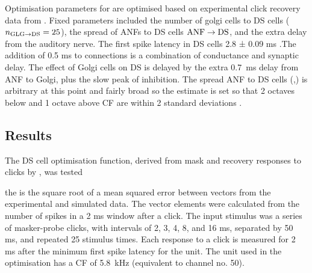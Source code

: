 % 

Optimisation parameters for \GLGDS are optimised based on experimental click
recovery data from \citep{BackoffPalombiEtAl:1997}.  Fixed parameters included
the number of golgi cells to DS cells ($\protect n_{\protect\textrm{{GLG}}\to\textrm{{DS}}} = 25$), the spread of ANFs to DS
cells $\protect\textrm{{ANF}}\to\textrm{{DS}}$, and the extra delay from the auditory nerve.  The first spike
latency in DS cells 2.8 ± 0.09 ms \citep{RhodeSmith:1986}.The addition of 0.5 ms
to \ANFDS connections is a combination of conductance and synaptic delay. The
effect of Golgi cells on DS is delayed by the extra 0.7~ms delay from ANF to
Golgi, plus the slow peak of \GABAa inhibition.  The spread ANF to DS cells
(\sANFDSh,\sANFDSl) is arbitrary at this point and fairly broad so the estimate
is set so that 2 octaves below and 1 octave above CF are within 2 standard
deviations \citep{PaoliniClark:1999}.






\subsection{Results}

The DS cell optimisation function, derived from mask and recovery responses to clicks by \citet{BackoffPalombiEtAl:1997}, was tested 


the is the square root of a mean squared error between vectors from the
experimental and simulated data. The vector elements were calculated from the
number of spikes in a 2 ms window after a click.  The input stimulus was a
series of masker-probe clicks, with intervals of 2, 3, 4, 8, and 16 ms,
separated by 50 ms, and repeated 25 stimulus times. Each response to a click is
measured for 2 ms after the minimum first spike latency for the unit.  The unit
used in the optimisation has a CF of 5.8~kHz (equivalent to channel no. 50).


